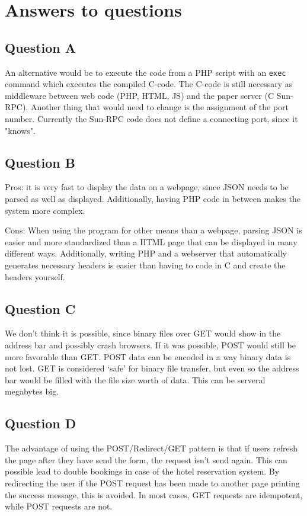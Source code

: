 \documentclass[11pt]{article}
\begin{document}
\section{Answers to questions}

\subsection{Question A}

An alternative would be to execute the code from a PHP script with an \texttt{exec} command which executes the compiled C-code. The C-code is still necessary as middleware between web code (PHP, HTML, JS) and the paper server (C Sun-RPC). Another thing that would need to change is the assignment of the port number. Currently the Sun-RPC code does not define a connecting port, since it "knows". 

\subsection{Question B}

Pros: it is very fast to display the data on a webpage, since JSON needs to be parsed as well as displayed. Additionally, having PHP code in between makes the system more complex.

Cons: When using the program for other means than a webpage, parsing JSON is easier and more standardized than a HTML page that can be displayed in many different ways. Additionally, writing PHP and a webserver that automatically generates necessary headers is easier than having to code in C and create the headers yourself.

\subsection{Question C}

We don't think it is possible, since binary files over GET would show in the address bar and possibly crash browsers. If it was possible, POST would still be more favorable than GET. POST data can be encoded in a way binary data is not lost. GET is considered `safe' for binary file transfer, but even so the address bar would be filled with the file size worth of data. This  can be serveral megabytes big.

\subsection{Question D}

The advantage of using the POST/Redirect/GET pattern is that if users refresh the page after they have send the form, the request isn't send again. This can possible lead to double bookings in case of the hotel reservation system. By redirecting the user if the POST request has been made to another page printing the success message, this is avoided. In most cases, GET requests are idempotent, while POST requests are not.
\end{document}
